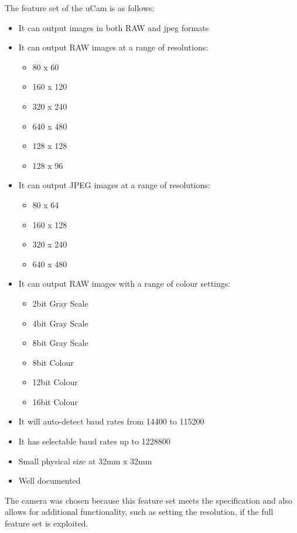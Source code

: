 The feature set of the uCam is as follows:

	\begin{itemize}
		\item It can output images in both RAW and jpeg formats
		\item It can output RAW images at a range of resolutions:
		\begin{itemize}
			\item 80 x 60
			\item 160 x 120
			\item 320 x 240
			\item 640 x 480
			\item 128 x 128
			\item 128 x 96
		\end{itemize}
		\item It can output JPEG images at a range of resolutions:
		\begin{itemize}
			\item 80 x 64
			\item 160 x 128
			\item 320 x 240
			\item 640 x 480
		\end{itemize}
		\item It can output RAW images with a range of colour settings:
		\begin{itemize}
			\item 2bit Gray Scale
			\item 4bit Gray Scale
			\item 8bit Gray Scale
			\item 8bit Colour
			\item 12bit Colour
			\item 16bit Colour
		\end{itemize}
		\item It will auto-detect baud rates from 14400 to 115200
		\item It has selectable baud rates up to 1228800
		\item Small physical size at 32mm x 32mm
		\item Well documented
	\end{itemize}

The camera was chosen because this feature set meets the specification and also allows for additional functionality, such as setting the resolution, if the full feature set is exploited.
